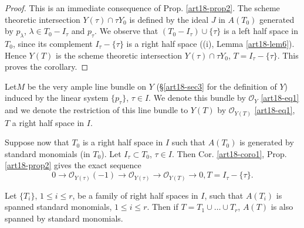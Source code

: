 \begin{proof}
This is an immediate consequence of Prop. \ref{art18-prop2}. The scheme theoretic intersection $Y(\tau) \cap \tau Y_0$ is defined by the ideal $J$ in $A(T_0)$ generated by $p_\lambda$, $\lambda \in T_0- I_\tau$ and $p_\tau$. We observe that $(T_0 - I_\tau) \cup \{\tau\}$ is a left half space in $T_0$, since its complement $I_\tau - \{\tau\}$ is a right half space (\cf (i), Lemma \ref{art18-lem6}). Hence $Y(T)$ is the scheme theoretic intersection $Y(\tau) \cap \tau Y_0$, $T = I_\tau -\{\tau\}$. This proves the corollary.
\end{proof}

\begin{remark}\label{art18-rem2}
Let\pageoriginale $M$ be the very ample line bundle on $Y$ (\cf \S \ref{art18-sec3} for the definition of $Y$) induced by the linear system $\{p_\tau\}$, $\tau \in I$. We denote this bundle by $\mathscr{O}_Y$ \ref{art18-eq1} and we denote the restriction of this line bundle to $Y(T)$ by $\mathscr{O}_{Y(T)}$ \ref{art18-eq1}, $T$ a right half space in $I$.

Suppose now that $T_0$ is a right half space in $I$ such that $A(T_0)$ is generated by standard monomials (in $T_0$). Let $I_\tau \subset T_0$, $\tau\in I$. Then Cor. \ref{art18-coro1}, Prop. \ref{art18-prop2} gives the exact sequence
\begin{equation*}
0 \to \mathscr{O}_{Y(\tau)} (-1) \to \mathscr{O}_{Y(\tau)} \to \mathscr{O}_{Y(T)} \to 0, T = I_\tau - \{ \tau\} . 
\tag*{(1)}\label{art18-eq1}
\end{equation*}
\end{remark}


\begin{coro}\label{art18-coro2}
Let $\{T_i\}$, $1 \leqslant i \leqslant r$, be a family of right half spaces in $I$, such that $A(T_i)$ is spanned standard monomials, $1 \leqslant i \leqslant r$. Then if $T = T_1 \cup \ldots \cup T_r$, $A(T)$ is also spanned by standard monomials.
\end{coro}

